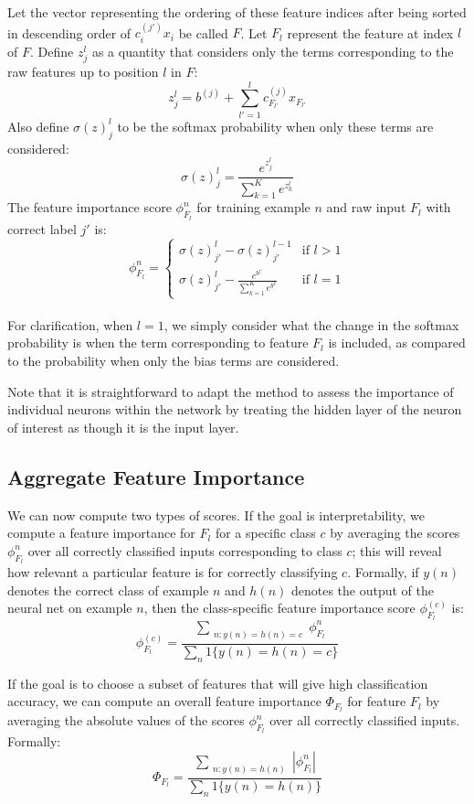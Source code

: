 \documentclass{article}
\begin{document}
Let the vector representing the ordering of these feature indices after being sorted in descending order of $c^{(j')}_ix_i$ be called $F$. Let $F_l$ represent the feature at index $l$ of $F$. Define $z_j^l$ as a quantity that considers only the terms corresponding to the raw features up to position $l$ in $F$:
$$z_j^l = b^{(j)} + \sum_{l'=1}^l c^{(j)}_{F_{l'}} x_{F_{l'}}$$
Also define $\sigma(z)_j^l$ to be the softmax probability when only these terms are considered:
$$\sigma(z)_j^l = \frac{e^{z_j^l}}{\sum_{k=1}^K e^{z_k^l}}$$
The feature importance score $\phi_{F_l}^n$ for training example $n$ and raw input $F_l$ with correct label $j'$ is:
$$\phi_{F_l}^n=\begin{cases}
\sigma(z)_{j'}^l - \sigma(z)_{j'}^{l-1} & \text{if } l > 1\\
\sigma(z)_{j'}^l - \frac{e^{b^{j'}}}{\sum_{k=1}^K e^{b^{k}}}& \text{if } l = 1
\end{cases}$$\\
For clarification, when $l=1$, we simply consider what the change in the softmax probability is when the term corresponding to feature $F_l$ is included, as compared to the probability when only the bias terms are considered.

Note that it is straightforward to adapt the method to assess the importance of individual neurons within the network by treating the hidden layer of the neuron of interest as though it is the input layer. 

\subsection{Aggregate Feature Importance}

We can now compute two types of scores. If the goal is interpretability, we compute a feature importance for $F_l$ for a specific class $c$ by averaging the scores $\phi_{F_l}^n$ over all correctly classified inputs corresponding to class $c$; this will reveal how relevant a particular feature is for correctly classifying $c$. Formally, if $y(n)$ denotes the correct class of example $n$ and $h(n)$ denotes the output of the neural net on example $n$, then the class-specific feature importance score $\phi^{(c)}_{F_l}$ is:
$$\phi^{(c)}_{F_l} = \frac{\sum\limits_{\substack{n: y(n) = h(n) = c}} \phi_{F_l}^n}{\sum_n 1\{y(n) = h(n) = c\}}$$

If the goal is to choose a subset of features that will give high classification accuracy, we can compute an overall feature importance $\Phi_{F_l}$ for feature $F_l$ by averaging the absolute values of the scores $\phi_{F_l}^n$ over all correctly classified inputs. Formally:
$$\Phi_{F_l} = \frac{\sum\limits_{\substack{n: y(n) = h(n)}} |\phi_{F_l}^n|}{\sum_n 1\{y(n) = h(n)\}}$$
\end{document}
